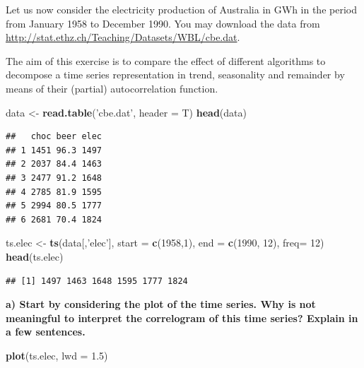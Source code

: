 \documentclass[
]{article}
\newenvironment{Shaded}{\begin{snugshade}}{\end{snugshade}}
\newcommand{\DataTypeTok}[1]{\textcolor[rgb]{0.13,0.29,0.53}{#1}}
\newcommand{\DecValTok}[1]{\textcolor[rgb]{0.00,0.00,0.81}{#1}}
\newcommand{\FloatTok}[1]{\textcolor[rgb]{0.00,0.00,0.81}{#1}}
\newcommand{\KeywordTok}[1]{\textcolor[rgb]{0.13,0.29,0.53}{\textbf{#1}}}
\newcommand{\NormalTok}[1]{#1}
\newcommand{\StringTok}[1]{\textcolor[rgb]{0.31,0.60,0.02}{#1}}
\begin{document}
Let us now consider the electricity production of Australia in GWh in
the period from January 1958 to December 1990. You may download the data
from \url{http://stat.ethz.ch/Teaching/Datasets/WBL/cbe.dat}.

The aim of this exercise is to compare the effect of different
algorithms to decompose a time series representation in trend,
seasonality and remainder by means of their (partial) autocorrelation
function.

\begin{Shaded}
\begin{Highlighting}[]
\NormalTok{data <-}\StringTok{ }\KeywordTok{read.table}\NormalTok{(}\StringTok{'cbe.dat'}\NormalTok{, }\DataTypeTok{header =}\NormalTok{ T)}
\KeywordTok{head}\NormalTok{(data)}
\end{Highlighting}
\end{Shaded}

\begin{verbatim}
##   choc beer elec
## 1 1451 96.3 1497
## 2 2037 84.4 1463
## 3 2477 91.2 1648
## 4 2785 81.9 1595
## 5 2994 80.5 1777
## 6 2681 70.4 1824
\end{verbatim}

\begin{Shaded}
\begin{Highlighting}[]
\NormalTok{ts.elec <-}\StringTok{ }\KeywordTok{ts}\NormalTok{(data[,}\StringTok{'elec'}\NormalTok{], }\DataTypeTok{start =} \KeywordTok{c}\NormalTok{(}\DecValTok{1958}\NormalTok{,}\DecValTok{1}\NormalTok{), }\DataTypeTok{end =} \KeywordTok{c}\NormalTok{(}\DecValTok{1990}\NormalTok{, }\DecValTok{12}\NormalTok{), }\DataTypeTok{freq=} \DecValTok{12}\NormalTok{)}
\KeywordTok{head}\NormalTok{(ts.elec)}
\end{Highlighting}
\end{Shaded}

\begin{verbatim}
## [1] 1497 1463 1648 1595 1777 1824
\end{verbatim}

\textbf{a) Start by considering the plot of the time series. Why is not
meaningful to interpret the correlogram of this time series? Explain in
a few sentences.}

\begin{Shaded}
\begin{Highlighting}[]
\KeywordTok{plot}\NormalTok{(ts.elec, }\DataTypeTok{lwd =} \FloatTok{1.5}\NormalTok{)}
\end{Highlighting}
\end{Shaded}
\end{document}
